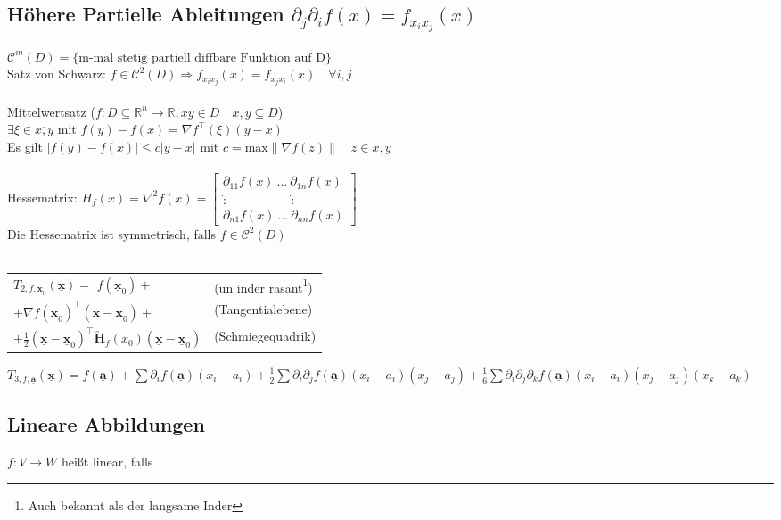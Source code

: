 \documentclass[6pt,a4paper]{scrartcl}
\let\olddot = \dot
\newcommand{\eset}[1]{\ensuremath{\bigl\{#1\bigr\}}}											%
\newcommand{\norm}[1]{\ensuremath{\|#1\|}}														%
\newcommand{\ma}[1]{\ensuremath{\utilde{\boldsymbol {#1}}}}										%
\newcommand{\svdots}{\ensuremath{\olddot :}}													%
\renewcommand{\vec}[1]{\ensuremath{\underline{\boldsymbol {#1}}}}								%
\renewcommand*{\dot}[1]{\accentset{\mbox{\textrm{\large\bfseries .}} }{#1}}						%
\begin{document}
\begin{multicols}{4}
\subsection{Höhere Partielle Ableitungen $\partial_j \partial_i f(x) = f_{x_i x_j} (x)$}
$\mathcal C^m (D) = \eset{\text{m-mal stetig partiell diffbare Funktion auf D}}$\\
Satz von Schwarz: $f \in \mathcal C^2 (D) \Rightarrow f_{x_i x_j} (x)= f_{x_j x_i} (x) \quad \forall i,j$\\
\\
Mittelwertsatz ($f:D\subseteq \mathbb R^n \rightarrow \mathbb R, xy \in D \quad x,y \subseteq D$)\\
$\exists \xi \in \overline{x,y}$ mit $f(y)-f(x)=\nabla f^\top (\xi)(y-x)$\\
Es gilt $|f(y) - f(x)| \le c|y-x|$ mit $c= \mathrm{max} \norm{\nabla f(z)} \quad z \in \overline{x,y}$\\
\\
Hessematrix: $H_f (x) = \nabla^2 f(x) = \begin{bmatrix} \partial_{11} f(x)\ ...\ \partial_{1n} f(x) \\ \svdots \quad \qquad \qquad \svdots \\ \partial_{n1} f(x)\ ...\ \partial_{nn} f(x) \end{bmatrix}$\\
Die Hessematrix ist symmetrisch, falls $f \in \mathcal C^2(D)$\\
\\ 
\begin{tabular}{ll}
	$T_{2,f, \vec x_0} (\vec x) =$ $f(\vec x_0) +$ & (un inder rasant\footnote{Auch bekannt als der langsame Inder})\\
	\qquad $+ \nabla f(\vec x_0)^\top (\vec x-\vec x_0) +$ & (Tangentialebene)\\
	\qquad $+ \frac{1}{2}(\vec x-\vec x_0)^\top \ma H_f(x_0)(\vec x- \vec x_0)$ & (Schmiegequadrik)\\
\end{tabular}

$T_{3,f,\vec a}(\vec x) = f(\vec a) + \sum \partial_i f(\vec a)(x_i - a_i) + \frac{1}{2} \sum \partial_i \partial_j f(\vec a)(x_i - a_i)(x_j - a_j) + \frac{1}{6} \sum \partial_i \partial_j \partial_k f(\vec a)(x_i - a_i)(x_j - a_j)(x_k - a_k)$

\subsection{Lineare Abbildungen}
$f:V \rightarrow W$ heißt linear, falls


\end{multicols}
\end{document}
